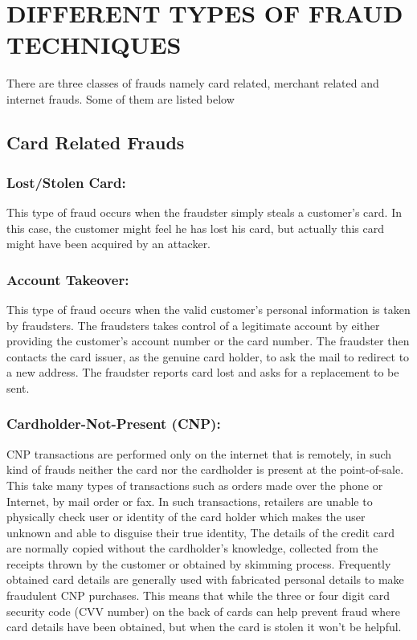 \documentclass{report}
\begin{document}

\chapter{DIFFERENT TYPES OF FRAUD TECHNIQUES}

There are three classes of frauds namely card related, merchant related and internet frauds. Some of them are listed below
\paragraph{}

\section{Card Related Frauds}
\paragraph{}

\subsection{Lost/Stolen Card:}
 This type of fraud occurs when the fraudster simply steals a customer’s card. In this case, the customer might feel he has lost his card, but actually this card might have been acquired by an attacker. 

\subsection{Account Takeover:}
This type of fraud occurs when the valid customer’s personal information is taken by fraudsters. The fraudsters takes control of a legitimate account by either providing the customer’s account number or the card number. The fraudster then contacts the card issuer, as the genuine card holder, to ask the mail to redirect to a new address. The fraudster reports card lost and asks for a replacement to be sent. 

\subsection{Cardholder-Not-Present (CNP):}
CNP transactions are performed only on the internet that is remotely, in such kind of frauds neither the card nor the cardholder is present at the point-of-sale. This take many types of transactions such as orders made over the phone or Internet, by mail order or fax. In such transactions, retailers are unable to physically check user or identity of the card holder which makes the user unknown and able to disguise their true identity, The details of the credit card are normally copied without the cardholder’s knowledge, collected from the receipts thrown by the customer or obtained by skimming process. Frequently obtained card details are generally used with fabricated personal details to make fraudulent CNP purchases. This means that while the three or four digit card security code (CVV number) on the back of cards can help prevent fraud where card details have been obtained, but when the card is stolen it won’t be helpful.
\end{document}

